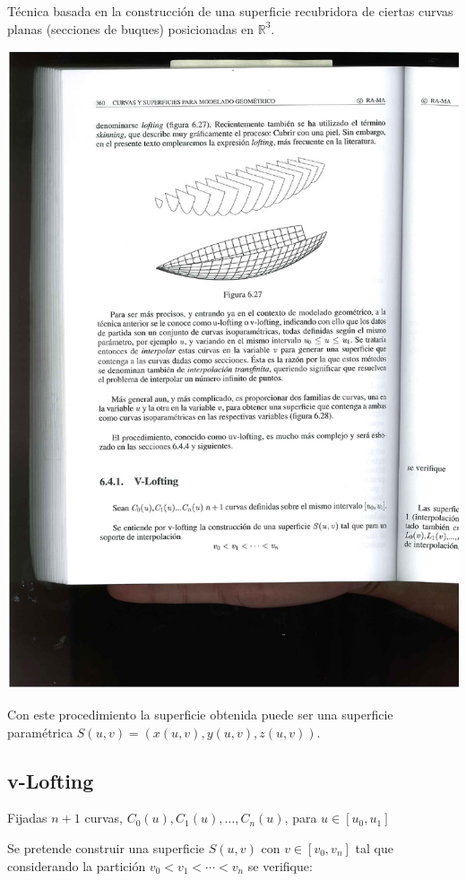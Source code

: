 \documentclass[ebook,oneside]{memoir}
\begin{document}
T\'{e}cnica basada en la construcci\'{o}n de una superficie recubridora de ciertas curvas planas (secciones de buques) posicionadas en $\mathbb{R}^3.$

\begin{center}
\includegraphics[scale=0.45]{6_27.pdf}
\end{center}

Con este procedimiento la superficie obtenida puede ser una superficie param\'{e}trica $S(u,v)=(x(u,v),y(u,v),z(u,v))$.

\subsection{v-Lofting}

Fijadas $n+1$ curvas, $C_0(u),C_1(u), \ldots, C_n(u)$,  para $u\in [u_0,u_1]$

Se pretende construir una superficie $S(u,v)$ con  $v\in [v_0,v_n]$ tal que considerando la partici\'{o}n $v_0<v_1<\cdots <v_n$
se verifique:
\end{document}
